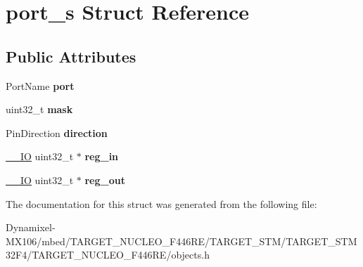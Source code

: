 \hypertarget{structport__s}{}\section{port\+\_\+s Struct Reference}
\label{structport__s}
\subsection*{Public Attributes}
\begin{DoxyCompactItemize}
\item 
Port\+Name {\bfseries port}\hypertarget{structport__s_a8db52e51a52d636c3537c837e37f505d}{}\label{structport__s_a8db52e51a52d636c3537c837e37f505d}

\item 
uint32\+\_\+t {\bfseries mask}\hypertarget{structport__s_a1cfd93e0c8deae9f8cff5c734f02db16}{}\label{structport__s_a1cfd93e0c8deae9f8cff5c734f02db16}

\item 
Pin\+Direction {\bfseries direction}\hypertarget{structport__s_a4c553e75645b462931ac70a07dfbed43}{}\label{structport__s_a4c553e75645b462931ac70a07dfbed43}

\item 
\hyperlink{core__sc300_8h_aec43007d9998a0a0e01faede4133d6be}{\+\_\+\+\_\+\+IO} uint32\+\_\+t $\ast$ {\bfseries reg\+\_\+in}\hypertarget{structport__s_ab22dd96d10dc17c936514a0bc399b590}{}\label{structport__s_ab22dd96d10dc17c936514a0bc399b590}

\item 
\hyperlink{core__sc300_8h_aec43007d9998a0a0e01faede4133d6be}{\+\_\+\+\_\+\+IO} uint32\+\_\+t $\ast$ {\bfseries reg\+\_\+out}\hypertarget{structport__s_ad0cdf6ee125141dbac658738b3bf497a}{}\label{structport__s_ad0cdf6ee125141dbac658738b3bf497a}

\end{DoxyCompactItemize}


The documentation for this struct was generated from the following file\+:\begin{DoxyCompactItemize}
\item 
Dynamixel-\/\+M\+X106/mbed/\+T\+A\+R\+G\+E\+T\+\_\+\+N\+U\+C\+L\+E\+O\+\_\+\+F446\+R\+E/\+T\+A\+R\+G\+E\+T\+\_\+\+S\+T\+M/\+T\+A\+R\+G\+E\+T\+\_\+\+S\+T\+M32\+F4/\+T\+A\+R\+G\+E\+T\+\_\+\+N\+U\+C\+L\+E\+O\+\_\+\+F446\+R\+E/objects.\+h\end{DoxyCompactItemize}

